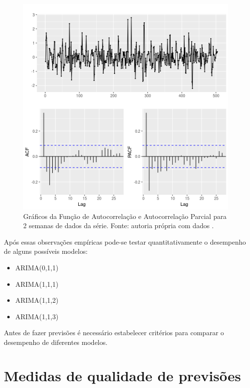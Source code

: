 \documentclass[
	12pt,				%
	openright,			%
	oneside,			%
	a4paper,			%
	english,			%
	french,				%
	spanish,			%
	brazil				%
	]{abntex2}
\begin{document}
\begin{figure}[h]
    \centering
	\includegraphics[width=\textwidth]{last3weeks_acf.png}
	\caption{Gráficos da Função de Autocorrelação e Autocorrelação Parcial para 2 semanas de dados da série. Fonte: autoria própria com dados \cite{era5}.}
\end{figure}
\FloatBarrier 

Após essas observações empíricas pode-se testar quantitativamente o desempenho de alguns possíveis modelos:

\begin{itemize}
	\item ARIMA(0,1,1)
	\item ARIMA(1,1,1)
	\item ARIMA(1,1,2)
	\item ARIMA(1,1,3)
\end{itemize}

Antes de fazer previsões é necessário estabelecer critérios para comparar o desempenho de diferentes modelos.

\section{Medidas de qualidade de previsões}\label{erro}
\end{document}
